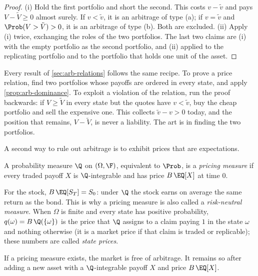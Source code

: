 \begin{proof}
(i) Hold the first portfolio and short the second. This costs $v-\tilde v$ and pays
$V-\tilde V\ge0$ almost surely. If $v<\tilde v$, it is an arbitrage of type (a); if
$v=\tilde v$ and $\Prob(V>\tilde V)>0$, it is an arbitrage of type (b). Both are excluded.
(ii) Apply (i) twice, exchanging the roles of the two portfolios. The last two claims are
(i) with the empty portfolio as the second portfolio, and (ii) applied to the replicating
portfolio and to the portfolio that holds one unit of the asset.
\end{proof}

\begin{remark}\label{rem:arb-recipe}
Every result of \cref{sec:arb-relations} follows the same recipe. To prove a price
relation, find two portfolios whose payoffs are ordered in every state, and apply
\cref{prop:arb-dominance}. To exploit a violation of the relation, run the proof backwards:
if $V\ge\tilde V$ in every state but the quotes have $v<\tilde v$, buy the cheap portfolio
and sell the expensive one. This collects $\tilde v-v>0$ today, and the position that
remains, $V-\tilde V$, is never a liability. The art is in finding the two portfolios.
\end{remark}

A second way to rule out arbitrage is to exhibit prices that are expectations.

\begin{definition}\label{def:arb-pricing-measure}
A probability measure $\Q$ on $(\Omega,\F)$, equivalent to $\Prob$, is a \emph{pricing
measure} if every traded payoff $X$ is $\Q$-integrable and has price $B\,\EQ[X]$ at time $0$.
\end{definition}

For the stock, $B\,\EQ[S_T]=S_0$: under $\Q$ the stock earns on average the same return as
the bond. This is why a pricing measure is also called a \emph{risk-neutral measure}. When
$\Omega$ is finite and every state has positive probability, $q(\omega)=B\,\Q(\{\omega\})$
is the price that $\Q$ assigns to a claim paying $1$ in the state $\omega$ and nothing
otherwise (it is a market price if that claim is traded or replicable); these numbers are
called \emph{state prices}.

\begin{lemma}\label{lem:arb-pricing-measure}
If a pricing measure exists, the market is free of arbitrage. It remains so after adding a
new asset with a $\Q$-integrable payoff $X$ and price $B\,\EQ[X]$.
\end{lemma}

